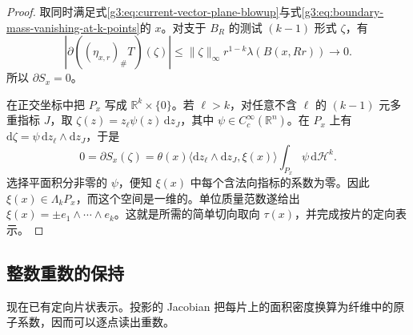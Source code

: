 \begin{proof}
	取同时满足式\eqref{g3:eq:current-vector-plane-blowup}与式\eqref{g3:eq:boundary-mass-vanishing-at-k-points}的 \(x\)。对支于 \(B_R\) 的测试 \((k-1)\) 形式 \(\zeta\)，有
	\[
		|\partial((\eta_{x,r})_\#T)(\zeta)|
		\le \|\zeta\|_\infty r^{1-k}\lambda(B(x,Rr))
		\longrightarrow0.
	\]
	所以 \(\partial S_x=0\)。

	在正交坐标中把 \(P_x\) 写成 \(\mathbb R^k\times\{0\}\)。若 \(\ell>k\)，对任意不含 \(\ell\) 的 \((k-1)\) 元多重指标 \(J\)，取
	\(\zeta(z)=z_\ell\psi(z)\,\mathrm dz_J\)，其中 \(\psi\in C_c^\infty(\mathbb R^n)\)。在 \(P_x\) 上有
	\(\mathrm d\zeta=\psi\,\mathrm dz_\ell\wedge\mathrm dz_J\)，于是
	\[
		0=\partial S_x(\zeta)
		=\theta(x)\langle\mathrm dz_\ell\wedge\mathrm dz_J,\xi(x)\rangle
		\int_{P_x}\psi\,\mathrm d\mathcal H^k.
	\]
	选择平面积分非零的 \(\psi\)，便知 \(\xi(x)\) 中每个含法向指标的系数为零。因此
	\(\xi(x)\in\Lambda_kP_x\)，而这个空间是一维的。单位质量范数遂给出
	\(\xi(x)=\pm e_1\wedge\cdots\wedge e_k\)。这就是所需的简单切向取向 \(\tau(x)\)，并完成按片的定向表示。
\end{proof}

\subsection{整数重数的保持}
\label{g3:subsec:2205:05}
现在已有定向片状表示。投影的 Jacobian 把每片上的面积密度换算为纤维中的原子系数，因而可以逐点读出重数。

